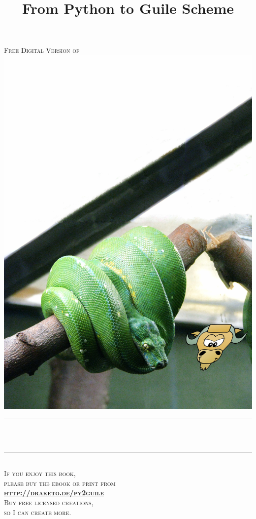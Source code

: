 \documentclass[12pt,a5]{scrartcl}
\title{From Python to Guile Scheme}                                %
\author{}                               %
\date{}                                         %
\makeatletter
\let\thetitle\@title
\makeatother
\begin{document}

\begin{titlepage}
    \centering
    \vspace*{0.0 cm}
        \textsc{\LARGE Free Digital Version of}\\[0.5 cm]  %
    \includegraphics[height=0.5\textwidth]{green_tree_python-flickr-author-msvg-michael_gil-license-cc_by-4533044418_707b0029b2_o-and-guile-gnu-goatee-by-martin-grabmueller-license-gplv3-or-later-unified-resynth.jpg}\\[1.0 cm]  %
    \rule{\linewidth}{0.2 mm} \\[0.4 cm]
    { \huge \bfseries \thetitle}\\
    \centering \rule{\linewidth}{0.2 mm} \\[1.5 cm]
    \textsc{\Large If you enjoy this book,\\[0.3cm] please buy the ebook or print from\\[0.7 cm] \textbf{\href{http://draketo.de/py2guile}{http://draketo.de/py2guile}}}\\[0.5 cm]               %

    \textsc{\Large Buy free licensed creations,\\[0.5cm] so I can create more.}
    
    
\end{titlepage}

\end{document}
